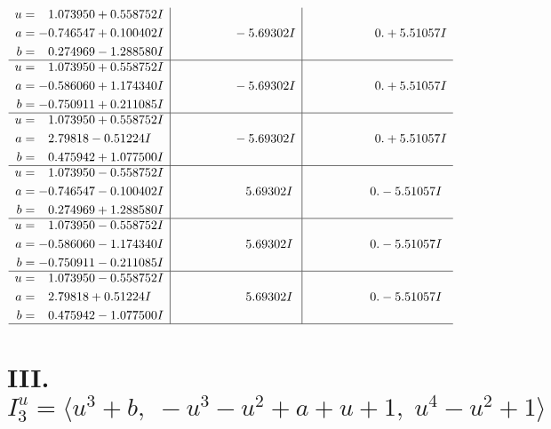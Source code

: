 \documentclass[1p]{elsarticle_modified}
\theoremstyle{definition}
\begin{document}
$$\begin{array}{c|c|c}
\begin{aligned}
u &= \phantom{-}1.073950 + 0.558752 I \\
a &= -0.746547 + 0.100402 I \\
b &= \phantom{-}0.274969 - 1.288580 I\end{aligned}
 & \phantom{-0.000000 } -5.69302 I & \phantom{-0.000000 -}0. + 5.51057 I \\ \hline\begin{aligned}
u &= \phantom{-}1.073950 + 0.558752 I \\
a &= -0.586060 + 1.174340 I \\
b &= -0.750911 + 0.211085 I\end{aligned}
 & \phantom{-0.000000 } -5.69302 I & \phantom{-0.000000 -}0. + 5.51057 I \\ \hline\begin{aligned}
u &= \phantom{-}1.073950 + 0.558752 I \\
a &= \phantom{-}2.79818 - 0.51224 I \\
b &= \phantom{-}0.475942 + 1.077500 I\end{aligned}
 & \phantom{-0.000000 } -5.69302 I & \phantom{-0.000000 -}0. + 5.51057 I \\ \hline\begin{aligned}
u &= \phantom{-}1.073950 - 0.558752 I \\
a &= -0.746547 - 0.100402 I \\
b &= \phantom{-}0.274969 + 1.288580 I\end{aligned}
 & \phantom{-0.000000 -}5.69302 I & \phantom{-0.000000 } 0. - 5.51057 I \\ \hline\begin{aligned}
u &= \phantom{-}1.073950 - 0.558752 I \\
a &= -0.586060 - 1.174340 I \\
b &= -0.750911 - 0.211085 I\end{aligned}
 & \phantom{-0.000000 -}5.69302 I & \phantom{-0.000000 } 0. - 5.51057 I \\ \hline\begin{aligned}
u &= \phantom{-}1.073950 - 0.558752 I \\
a &= \phantom{-}2.79818 + 0.51224 I \\
b &= \phantom{-}0.475942 - 1.077500 I\end{aligned}
 & \phantom{-0.000000 -}5.69302 I & \phantom{-0.000000 } 0. - 5.51057 I\\
 \hline 
 \end{array}$$\newpage\newpage\renewcommand{\arraystretch}{1}
\centering \section*{III. $I^u_{3}= \langle u^3+b,\;- u^3- u^2+a+u+1,\;u^4- u^2+1 \rangle$}
\end{document}
